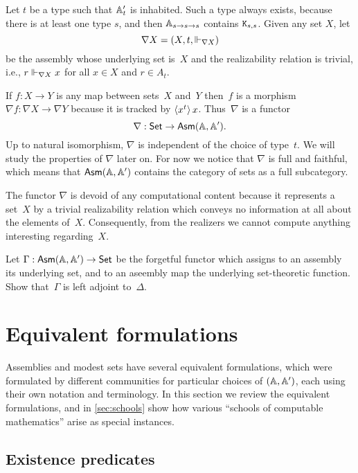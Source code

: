 Let $t$ be a type such that $\mathbb{A}'_{t}$ is inhabited. Such a type
always exists, because there is at least one type $s$, and then
$\mathbb{A}_{s \to s \to s}$ contains $\mathtt{K}_{s,s}$. Given any set $X$, let
%
\begin{equation*}
  \nabla X = (X, t, {\Vdash_{\nabla X}})
\end{equation*}
%
be the assembly whose underlying set is~$X$ and the realizability relation is trivial, i.e., $r \Vdash_{\nabla X} x$ for all $x \in X$ and $r \in A_t$.

If $f : X \to Y$ is any map between sets~$X$ and~$Y$ then~$f$ is a morphism $\nabla f : \nabla X \to \nabla Y$ because it is tracked by $\langle x^{t} \rangle\,{x}$. Thus~$\nabla$ is a functor
%
\begin{equation*}
  \nabla : \mathsf{Set} \to \mathsf{Asm}(\mathbb{A},\mathbb{A}').
\end{equation*}
%
Up to natural isomorphism, $\nabla$ is independent of the choice of
type~$t$. We will study the properties of $\nabla$ later on. For now
we notice that $\nabla$ is full and faithful, which means that
$\mathsf{Asm}(\mathbb{A},\mathbb{A}')$ contains the category of sets as a full
subcategory.

The functor $\nabla$ is devoid of any computational content because it
represents a set~$X$ by a trivial realizability relation which conveys
no information at all about the elements of~$X$. Consequently, from
the realizers we cannot compute anything interesting regarding~$X$.

\begin{exercise}
  Let $\Gamma : \mathsf{Asm}(\mathbb{A},\mathbb{A}') \to \mathsf{Set}$ be the forgetful functor which assigns to an assembly its underlying set, and to an
  aseembly map the underlying set-theoretic function. Show that~$\Gamma$ is left adjoint to~$\Delta$.
\end{exercise}

\section{Equivalent formulations}
\label{sec:equivalent-formulations}

Assemblies and modest sets have several equivalent formulations, which were formulated by different communities for particular choices of $(\mathbb{A}, \mathbb{A}')$, each using their own notation and terminology. In this section we review the equivalent formulations, and in \cref{sec:schools} show how various ``schools of computable mathematics'' arise as special instances.

\subsection{Existence predicates}
\label{sec:existence-predicates}

